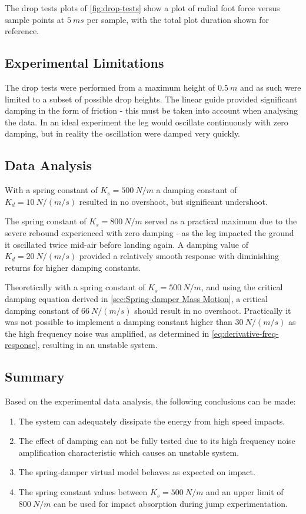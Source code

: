 The drop tests plots of \cref{fig:drop-tests} show a plot of radial foot force versus sample points at $5\ ms$ per sample, with the total plot duration shown for reference.

\subsection{Experimental Limitations}

The drop tests were performed from a maximum height of $0.5\ m$ and as such were limited to a subset of possible drop heights. The linear guide provided significant damping in the form of friction - this must be taken into account when analysing the data. In an ideal experiment the leg would oscillate continuously with zero damping, but in reality the oscillation were damped very quickly.

\subsection{Data Analysis}

With a spring constant of $K_s = 500\ N/m$ a damping constant of $K_d = 10\ N/(m/s)$ resulted in no overshoot, but significant undershoot.

The spring constant of $K_s = 800\ N/m$ served as a practical maximum due to the severe rebound experienced with zero damping - as the leg impacted the ground it oscillated twice mid-air before landing again. A damping value of $K_d = 20\ N/(m/s)$ provided a relatively smooth response with diminishing returns for higher damping constants. 

Theoretically with a spring constant of $K_s = 500\ N/m$, and using the critical damping equation derived in \cref{sec:Spring-damper Mass Motion}, a critical damping constant of $66\ N/(m/s)$ should result in no overshoot. Practically it was not possible to implement a damping constant higher than $30\ N/(m/s)$ as the high frequency noise was amplified, as determined in \cref{eq:derivative-freq-response}, resulting in an unstable system.

\subsection{Summary}

Based on the experimental data analysis, the following conclusions can be made:
\begin{enumerate}
\item The system can adequately dissipate the energy from high speed impacts.
\item The effect of damping can not be fully tested due to its high frequency noise amplification characteristic which causes an unstable system. 
\item The spring-damper virtual model behaves as expected on impact.
\item The spring constant values between $K_s = 500\ N/m$ and an upper limit of $800\ N/m$ can be used for impact absorption during jump experimentation.
\end{enumerate}


